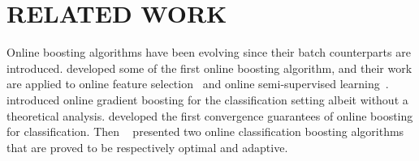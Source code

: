 

\section{RELATED WORK}


Online boosting algorithms have been evolving since their batch counterparts are introduced. \cite{Oza01onlinebagging} developed some of the first online boosting algorithm, and their work are applied to online feature selection~\citep{grabner:2006} and online semi-supervised learning~\citep{grabner:2008}. 
\cite{leistner:2009} introduced online gradient boosting for the classification setting albeit without a theoretical analysis. \cite{lu:2012} developed the first convergence guarantees of online boosting for classification. Then ~\cite{beygelzimer2015optimal} presented two online classification boosting algorithms that are proved to be respectively optimal and adaptive. 

